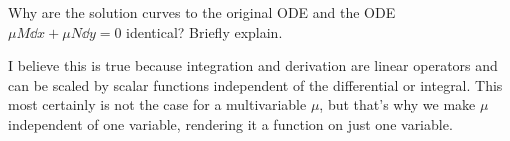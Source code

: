 Why are the solution curves to the original ODE and the ODE $\mu M \dd x + \mu N \dd y = 0$ identical? Briefly explain.

\nl I believe this is true because integration and derivation are linear operators and can be scaled by scalar functions independent of the differential or integral. This most certainly is not the case for a multivariable $\mu$, but that's why we make $\mu$ independent of one variable, rendering it a function on just one variable.